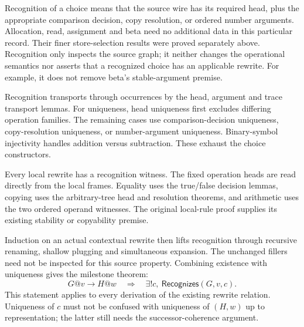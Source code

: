 

Recognition of a choice means that the source wire has its required head,
plus the appropriate comparison decision, copy resolution, or ordered number
arguments. Allocation, read, assignment and beta need no additional data in
this particular record. Their finer store-selection results were proved
separately above. Recognition only inspects the source graph; it neither
changes the operational semantics nor asserts that a recognized choice has
an applicable rewrite. For example, it does not remove beta's stable-argument
premise.


Recognition transports through occurrences by the head, argument and trace
transport lemmas. For uniqueness, head uniqueness first excludes differing
operation families. The remaining cases use comparison-decision uniqueness,
copy-resolution uniqueness, or number-argument uniqueness. Binary-symbol
injectivity handles addition versus subtraction. These exhaust the choice
constructors.



Every local rewrite has a recognition witness. The fixed operation heads
are read directly from the local frames. Equality uses the true/false decision
lemmas, copying uses the arbitrary-tree head and resolution theorems, and
arithmetic uses the two ordered operand witnesses. The original local-rule
proof supplies its existing stability or copyability premise.

Induction on an actual contextual rewrite then lifts recognition through
recursive renaming, shallow plugging and simultaneous expansion. The unchanged
fillers need not be inspected for this source property. Combining existence
with uniqueness gives the milestone theorem:
\[
 G@v\longrightarrow H@w\quad\Longrightarrow\quad
 \exists!c,\ \mathsf{Recognizes}(G,v,c).
\]
This statement applies to every derivation of the existing rewrite relation.
Uniqueness of $c$ must not be confused with uniqueness of $(H,w)$ up to
representation; the latter still needs the successor-coherence argument.


